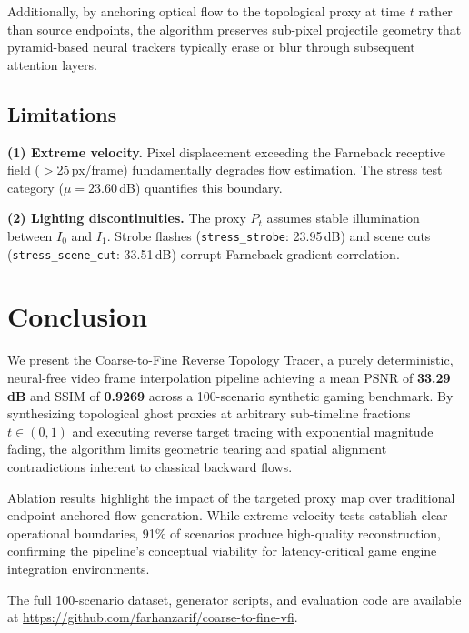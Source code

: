 \documentclass{article}
\begin{document}
Additionally, by anchoring optical flow to the topological proxy at time $t$ rather than source endpoints, the algorithm preserves sub-pixel projectile geometry that pyramid-based neural trackers typically erase or blur through subsequent attention layers.

\subsection{Limitations}

\textbf{(1) Extreme velocity.} Pixel displacement exceeding the Farneback receptive field ($>$25\,px/frame) fundamentally degrades flow estimation. The stress test category ($\mu = 23.60$\,dB) quantifies this boundary.

\textbf{(2) Lighting discontinuities.} The proxy $P_t$ assumes stable illumination between $I_0$ and $I_1$. Strobe flashes (\texttt{stress\_strobe}: 23.95\,dB) and scene cuts (\texttt{stress\_scene\_cut}: 33.51\,dB) corrupt Farneback gradient correlation. 

\section{Conclusion}

We present the Coarse-to-Fine Reverse Topology Tracer, a purely deterministic, neural-free video frame interpolation pipeline achieving a mean PSNR of \textbf{33.29\,dB} and SSIM of \textbf{0.9269} across a 100-scenario synthetic gaming benchmark. By synthesizing topological ghost proxies at arbitrary sub-timeline fractions $t \in (0,1)$ and executing reverse target tracing with exponential magnitude fading, the algorithm limits geometric tearing and spatial alignment contradictions inherent to classical backward flows. 

Ablation results highlight the impact of the targeted proxy map over traditional endpoint-anchored flow generation. While extreme-velocity tests establish clear operational boundaries, 91\% of scenarios produce high-quality reconstruction, confirming the pipeline's conceptual viability for latency-critical game engine integration environments.

The full 100-scenario dataset, generator scripts, and evaluation code are available at \url{https://github.com/farhanzarif/coarse-to-fine-vfi}.

\end{document}
